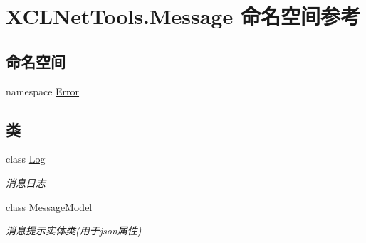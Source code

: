 \hypertarget{namespace_x_c_l_net_tools_1_1_message}{}\section{X\+C\+L\+Net\+Tools.\+Message 命名空间参考}
\label{namespace_x_c_l_net_tools_1_1_message}
\subsection*{命名空间}
\begin{DoxyCompactItemize}
\item 
namespace \hyperlink{namespace_x_c_l_net_tools_1_1_message_1_1_error}{Error}
\end{DoxyCompactItemize}
\subsection*{类}
\begin{DoxyCompactItemize}
\item 
class \hyperlink{class_x_c_l_net_tools_1_1_message_1_1_log}{Log}
\begin{DoxyCompactList}\small\item\em 消息日志 \end{DoxyCompactList}\item 
class \hyperlink{class_x_c_l_net_tools_1_1_message_1_1_message_model}{Message\+Model}
\begin{DoxyCompactList}\small\item\em 消息提示实体类(用于json属性) \end{DoxyCompactList}\end{DoxyCompactItemize}
